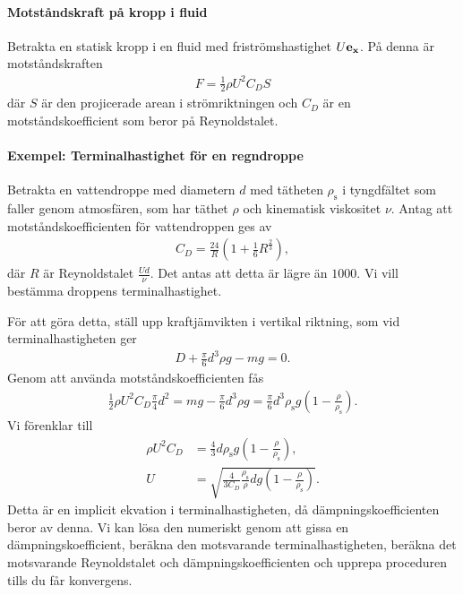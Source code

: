 \paragraph{Motståndskraft på kropp i fluid}
Betrakta en statisk kropp i en fluid med friströmshastighet $U\vb{e}_{\vb{x}}$. På denna är motståndskraften
\begin{align*}
	F = \frac{1}{2}\rho U^{2}C_{D}S
\end{align*}
där $S$ är den projicerade arean i strömriktningen och $C_{D}$ är en motståndskoefficient som beror på Reynoldstalet.

\paragraph{Exempel: Terminalhastighet för en regndroppe}
Betrakta en vattendroppe med diametern $d$ med tätheten $\rho_{\text{s}}$ i tyngdfältet som faller genom atmosfären, som har täthet $\rho$ och kinematisk viskositet $\nu$. Antag att motståndskoefficienten för vattendroppen ges av
\begin{align*}
	C_{D} = \frac{24}{R}\left(1 + \frac{1}{6}R^{\frac{2}{3}}\right),
\end{align*}
där $R$ är Reynoldstalet $\frac{Ud}{\nu}$. Det antas att detta är lägre än $1000$. Vi vill bestämma droppens terminalhastighet.

För att göra detta, ställ upp kraftjämvikten i vertikal riktning, som vid terminalhastigheten ger
\begin{align*}
	D + \frac{\pi}{6}d^{3}\rho g - mg = 0.
\end{align*}
Genom att använda motståndskoefficienten fås
\begin{align*}
	\frac{1}{2}\rho U^{2}C_{D}\frac{\pi}{4}d^{2} = mg - \frac{\pi}{6}d^{3}\rho g = \frac{\pi}{6}d^{3}\rho_{\text{s}}g\left(1 - \frac{\rho}{\rho_{\text{s}}}\right).
\end{align*}
Vi förenklar till
\begin{align*}
	\rho U^{2}C_{D} &= \frac{4}{3}d\rho_{\text{s}}g\left(1 - \frac{\rho}{\rho_{\text{s}}}\right), \\
	U               &= \sqrt{\frac{4}{3C_{D}}\frac{\rho_{\text{s}}}{\rho}dg\left(1 - \frac{\rho}{\rho_{\text{s}}}\right)}.
\end{align*}
Detta är en implicit ekvation i terminalhastigheten, då dämpningskoefficienten beror av denna. Vi kan lösa den numeriskt genom att gissa en dämpningskoefficient, beräkna den motsvarande terminalhastigheten, beräkna det motsvarande Reynoldstalet och dämpningskoefficienten och upprepa proceduren tills du får konvergens.